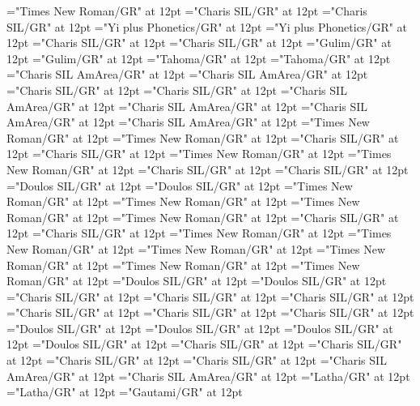 \documentclass[a4paper]{article}
\begin{document}
\font\spanid="Times New Roman/GR" at 12pt
\font\diviixpin="Charis SIL/GR" at 12pt
\font\spaniixpin="Charis SIL/GR" at 12pt
\font\divii="Yi plus Phonetics/GR" at 12pt
\font\spanii="Yi plus Phonetics/GR" at 12pt
\font\divkm="Charis SIL/GR" at 12pt
\font\spankm="Charis SIL/GR" at 12pt
\font\divko="Gulim/GR" at 12pt
\font\spanko="Gulim/GR" at 12pt
\font\divlv="Tahoma/GR" at 12pt
\font\spanlv="Tahoma/GR" at 12pt
\font\divmiz="Charis SIL AmArea/GR" at 12pt
\font\spanmiz="Charis SIL AmArea/GR" at 12pt
\font\divms="Charis SIL/GR" at 12pt
\font\spanms="Charis SIL/GR" at 12pt
\font\divmxbfonipa="Charis SIL AmArea/GR" at 12pt
\font\spanmxbfonipa="Charis SIL AmArea/GR" at 12pt
\font\divmxb="Charis SIL AmArea/GR" at 12pt
\font\spanmxb="Charis SIL AmArea/GR" at 12pt
\font\divmy="Times New Roman/GR" at 12pt
\font\spanmy="Times New Roman/GR" at 12pt
\font\divne="Charis SIL/GR" at 12pt
\font\spanne="Charis SIL/GR" at 12pt
\font\divpt="Times New Roman/GR" at 12pt
\font\spanpt="Times New Roman/GR" at 12pt
\font\divqaafonipaxkal="Charis SIL/GR" at 12pt
\font\spanqaafonipaxkal="Charis SIL/GR" at 12pt
\font\divqaafonipaxyii="Doulos SIL/GR" at 12pt
\font\spanqaafonipaxyii="Doulos SIL/GR" at 12pt
\font\divqaaxfwt="Times New Roman/GR" at 12pt
\font\spanqaaxfwt="Times New Roman/GR" at 12pt
\font\divqaaxgot="Times New Roman/GR" at 12pt
\font\spanqaaxgot="Times New Roman/GR" at 12pt
\font\divqaaxkal="Charis SIL/GR" at 12pt
\font\spanqaaxkal="Charis SIL/GR" at 12pt
\font\divqaaxlel="Times New Roman/GR" at 12pt
\font\spanqaaxlel="Times New Roman/GR" at 12pt
\font\divqaaxpig="Times New Roman/GR" at 12pt
\font\spanqaaxpig="Times New Roman/GR" at 12pt
\font\divqaaxsim="Times New Roman/GR" at 12pt
\font\spanqaaxsim="Times New Roman/GR" at 12pt
\font\divqaaxsta="Doulos SIL/GR" at 12pt
\font\spanqaaxsta="Doulos SIL/GR" at 12pt
\font\divqaaZxxxxkalAUDIO="Charis SIL/GR" at 12pt
\font\spanqaaZxxxxkalAUDIO="Charis SIL/GR" at 12pt
\font\divro="Charis SIL/GR" at 12pt
\font\spanro="Charis SIL/GR" at 12pt
\font\divru="Charis SIL/GR" at 12pt
\font\spanru="Charis SIL/GR" at 12pt
\font\divsehfonipaxetic="Doulos SIL/GR" at 12pt
\font\spansehfonipaxetic="Doulos SIL/GR" at 12pt
\font\divsehfonipa="Doulos SIL/GR" at 12pt
\font\spansehfonipa="Doulos SIL/GR" at 12pt
\font\divsehZxxxxaudio="Charis SIL/GR" at 12pt
\font\spansehZxxxxaudio="Charis SIL/GR" at 12pt
\font\divseh="Charis SIL/GR" at 12pt
\font\spanseh="Charis SIL/GR" at 12pt
\font\divstp="Charis SIL AmArea/GR" at 12pt
\font\spanstp="Charis SIL AmArea/GR" at 12pt
\font\divta="Latha/GR" at 12pt
\font\spanta="Latha/GR" at 12pt
\font\divte="Gautami/GR" at 12pt
\end{document}
